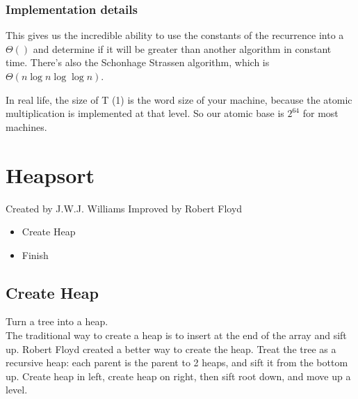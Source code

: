 \documentclass[english, 10pt]{article}
\begin{document}
\subsubsection{Implementation details}

This gives us the incredible ability to use the constants of the recurrence
into a $\Theta()$ and determine if it will be greater than another algorithm in
constant time.  There's also the Schonhage Strassen algorithm, which is
$\Theta(n\log n \log\log n)$.

In real life, the size of T (1) is the word size of your machine, because the
atomic multiplication is implemented at that level. So our atomic base is
$2^{64}$ for most machines.

\section{Heapsort}
Created by J.W.J. Williams
Improved by Robert Floyd

\begin{itemize}
    \item Create Heap
    \item Finish
\end{itemize}



\subsection{Create Heap}
Turn a tree into a heap.\\
The traditional way to create a heap is to insert at the end of the array and sift up.
Robert Floyd created a better way to create the heap. Treat the tree as a recursive heap:
each parent is the parent to 2 heaps, and sift it from the bottom up. Create heap in left,
create heap on right, then sift root down, and move up a level.
\end{document}
